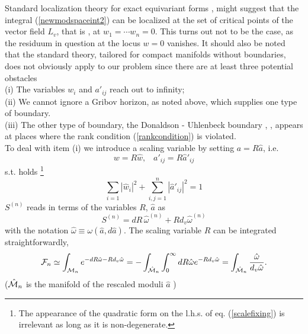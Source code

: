 \documentclass[a4paper,12pt]{article}
\begin{document}
Standard localization theory for exact equivariant forms 
\cite{berline}, \cite{schwarz} might suggest that the integral 
(\ref{newmodspaceint2}) can be localized at the set of critical 
points of the vector field $L_v$, that is , at $w_1=\cdots w_n=0$. 
This turns out not to be the case, as the residuum in question at 
the locus $w=0$ vanishes. It should also be noted that the standard 
theory, tailored for compact manifolds without boundaries, does 
not obviously apply to our problem since there are at least three 
potential obstacles \\
(i) The variables $w_i$ and $a'_{ij}$ reach out to infinity; \\
(ii) We cannot ignore a Gribov horizon, as noted above, which 
supplies one type of boundary. \\
(iii) The other type of boundary, the Donaldson - Uhlenbeck boundary 
\cite{donaldson}, \cite{uhlenbeck}, appears at places where the 
rank condition (\ref{rankcondition}) is violated. \\
To deal with item (i) we introduce a scaling variable by setting 
$a=R\hat{a}$, i.e.  
\begin{equation}
w=R\hat{w}, \, \, \, \, \, a'_{ij}=R\hat{a}'_{ij}
\end{equation}
s.t. holds \footnote{The appearance of the quadratic form on 
the l.h.s. of eq. (\ref{scalefixing}) is irrelevant as long as 
it is non-degenerate.}
\begin{equation}
\sum_{i=1} \left| \hat{w}_i \right|^2 +\sum_{i,j=1}^n 
\left| \hat{a}'_{ij} \right|^2 = 1
\label{scalefixing} 
\end{equation}       
$S^{(n)}$ reads in terms of the variables $R$, $\hat{a}$ as 
\begin{equation}
S^{(n)}=dR \, \hat{\omega}^{(n)}+Rd_v \hat{\omega}^{(n)}
\end{equation}
with the notation $\hat{\omega} \equiv \omega \left(\hat{a}, 
d \hat{a} \right)$. The scaling variable $R$ can be 
integrated straightforwardly, 
\begin{eqnarray}
{\cal F}_n
\simeq \int_{{\cal M}_n} e^{-dR \hat{\omega}-
Rd_v \hat{\omega}}=-\int_{\hat{{\cal M}}_n}\int_0^{\infty} dR 
\hat{\omega}e^{-Rd_v \hat{\omega}}=\int_{\hat{{\cal M}}_n} 
\frac{\hat{\omega}}{d_v \hat{\omega}}.  
\label{newmodspaceint3}
\end{eqnarray}
($\hat{{\cal M}}_n$ is the manifold of the rescaled moduli $\hat{a}$ )
\end{document}
